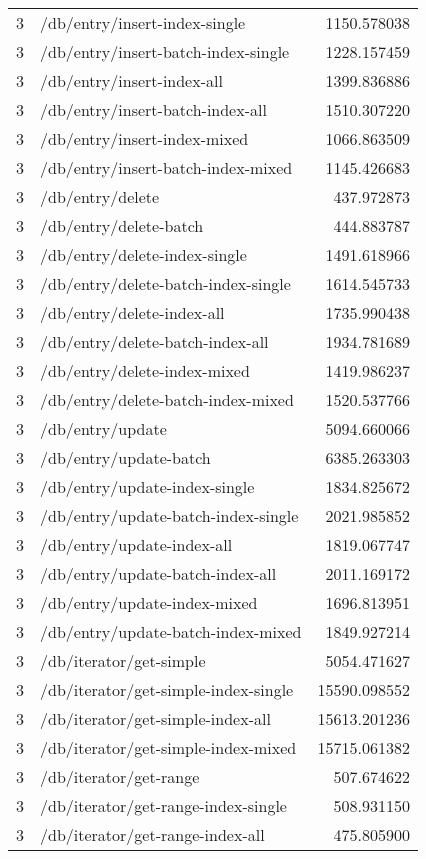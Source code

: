 \begin{longtable}{rlr}
3 & /db/entry/insert-index-single & 1150.578038 \\
3 & /db/entry/insert-batch-index-single & 1228.157459 \\
3 & /db/entry/insert-index-all & 1399.836886 \\
3 & /db/entry/insert-batch-index-all & 1510.307220 \\
3 & /db/entry/insert-index-mixed & 1066.863509 \\
3 & /db/entry/insert-batch-index-mixed & 1145.426683 \\
3 & /db/entry/delete & 437.972873 \\
3 & /db/entry/delete-batch & 444.883787 \\
3 & /db/entry/delete-index-single & 1491.618966 \\
3 & /db/entry/delete-batch-index-single & 1614.545733 \\
3 & /db/entry/delete-index-all & 1735.990438 \\
3 & /db/entry/delete-batch-index-all & 1934.781689 \\
3 & /db/entry/delete-index-mixed & 1419.986237 \\
3 & /db/entry/delete-batch-index-mixed & 1520.537766 \\
3 & /db/entry/update & 5094.660066 \\
3 & /db/entry/update-batch & 6385.263303 \\
3 & /db/entry/update-index-single & 1834.825672 \\
3 & /db/entry/update-batch-index-single & 2021.985852 \\
3 & /db/entry/update-index-all & 1819.067747 \\
3 & /db/entry/update-batch-index-all & 2011.169172 \\
3 & /db/entry/update-index-mixed & 1696.813951 \\
3 & /db/entry/update-batch-index-mixed & 1849.927214 \\
3 & /db/iterator/get-simple & 5054.471627 \\
3 & /db/iterator/get-simple-index-single & 15590.098552 \\
3 & /db/iterator/get-simple-index-all & 15613.201236 \\
3 & /db/iterator/get-simple-index-mixed & 15715.061382 \\
3 & /db/iterator/get-range & 507.674622 \\
3 & /db/iterator/get-range-index-single & 508.931150 \\
3 & /db/iterator/get-range-index-all & 475.805900 \\

\end{longtable}
